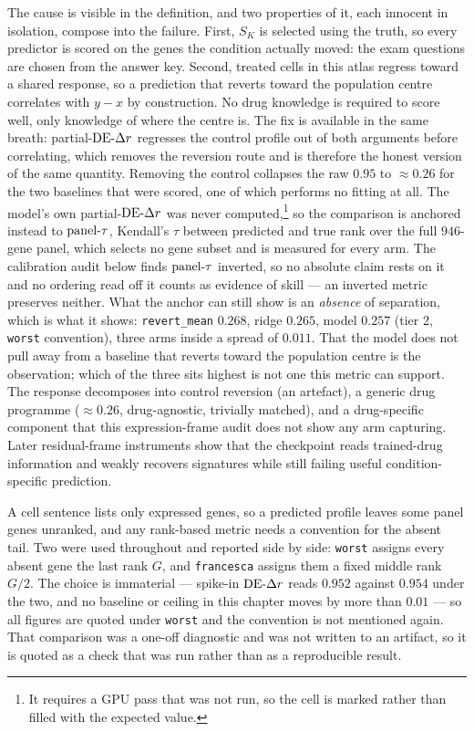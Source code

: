 The cause is visible in the definition, and two properties of it, each innocent in isolation,
compose into the failure. First, $S_K$ is selected using the truth, so every predictor is scored on
the genes the condition actually moved: the exam questions are chosen from the answer key. Second,
treated cells in this atlas regress toward a shared response, so a prediction that reverts toward
the population centre correlates with $y - x$ by construction. No drug knowledge is required to
score well, only knowledge of where the centre is. The fix is available in the same breath:
partial-$\textrm{DE-}\Delta r$ regresses the control profile out of both arguments before correlating, which
removes the reversion route and is therefore the honest version of the same quantity. Removing the
control collapses the raw $0.95$ to $\approx 0.26$ for the two baselines that were scored, one of
which performs no fitting at all. The model's own partial-$\textrm{DE-}\Delta r$
was never computed,\footnote{It requires a GPU pass that was not run, so the cell is marked rather
than filled with the expected value.} so the comparison is anchored instead to $\textrm{panel-}\tau$, Kendall's
$\tau$ between predicted and true rank over the full $946$-gene panel, which selects no gene subset
and is measured for every arm. The calibration audit below finds $\textrm{panel-}\tau$ inverted, so no
absolute claim rests on it and no ordering read off it counts as evidence of skill --- an inverted
metric preserves neither. What the anchor can still show is an \emph{absence} of separation, which
is what it shows: \texttt{revert\_mean} $0.268$, ridge $0.265$, model $0.257$ (tier 2,
\texttt{worst} convention), three arms inside a spread of $0.011$. That the model does not pull away
from a baseline that reverts toward the population centre is the observation; which of the three
sits highest is not one this metric can support. The response decomposes into control
reversion (an artefact), a generic drug programme ($\approx 0.26$, drug-agnostic, trivially
matched), and a drug-specific component that this expression-frame audit does not show any arm
capturing. Later residual-frame instruments show that the checkpoint reads trained-drug information
and weakly recovers signatures while still failing useful condition-specific prediction.

A cell sentence lists only expressed genes, so a predicted profile leaves some panel genes unranked,
and any rank-based metric needs a convention for the absent tail. Two were used throughout and
reported side by side: \texttt{worst} assigns every absent gene the last rank $G$, and
\texttt{francesca} assigns them a fixed middle rank $G/2$. The choice is immaterial --- spike-in
$\textrm{DE-}\Delta r$ reads $0.952$ against $0.954$ under the two, and no baseline or ceiling in this chapter
moves by more than $0.01$ --- so all figures are quoted under \texttt{worst} and the convention is
not mentioned again. That comparison was a one-off diagnostic and was not written to an artifact,
so it is quoted as a check that was run rather than as a reproducible result.

